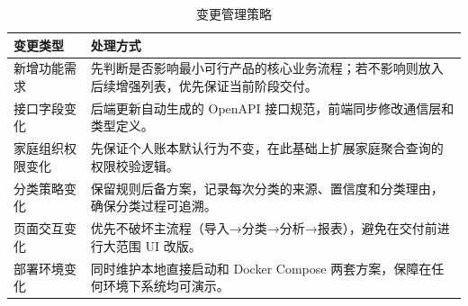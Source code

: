 \begin{table}[H]
\centering
\caption{变更管理策略}
\label{tab:change-management}
\begin{tabular}{p{3cm}p{10.2cm}}
\toprule
\textbf{变更类型} & \textbf{处理方式} \\
\midrule
新增功能需求 & 先判断是否影响最小可行产品的核心业务流程；若不影响则放入后续增强列表，优先保证当前阶段交付。 \\
\addlinespace
接口字段变化 & 后端更新自动生成的 OpenAPI 接口规范，前端同步修改通信层和类型定义。 \\
\addlinespace
家庭组织权限变化 & 先保证个人账本默认行为不变，在此基础上扩展家庭聚合查询的权限校验逻辑。 \\
\addlinespace
分类策略变化 & 保留规则后备方案，记录每次分类的来源、置信度和分类理由，确保分类过程可追溯。 \\
\addlinespace
页面交互变化 & 优先不破坏主流程（导入→分类→分析→报表），避免在交付前进行大范围 UI 改版。 \\
\addlinespace
部署环境变化 & 同时维护本地直接启动和 Docker Compose 两套方案，保障在任何环境下系统均可演示。 \\
\bottomrule
\end{tabular}
\end{table}
